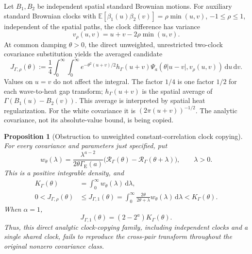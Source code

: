 \documentclass[12pt,oneside,openany]{book}
\makeatletter
\let\lean@pending\@empty
\newcommand{\LeanMarker}[1]{\gdef\lean@pending{#1}}
\numberwithin{equation}{section}
\newtheorem{proposition}[theorem]{Proposition}
\theoremstyle{nogostyle}
\theoremstyle{definition}
\newcommand{\E}{\mathbb{E}}
\newcommand{\ud}{\,\mathrm{d}}
\makeatother
\begin{document}
Let \(B_1,B_2\) be independent spatial standard Brownian motions. For auxiliary
standard Brownian clocks with \(\E[\beta_1(u)\beta_2(v)]=\rho\min(u,v)\),
\(-1\le\rho\le1\), independent of the spatial paths, the clock difference has
variance
\[
  v_\rho(u,v)=u+v-2\rho\min(u,v).
\]
At common damping \(\theta>0\), the direct unweighted, unrestricted two-clock
covariance substitution yields the averaged candidate
\begin{equation}\label{E:naive-clock-candidate}
  J_{\Gamma,\rho}(\theta)
  :=\frac14\int_0^\infty\int_0^\infty
  e^{-\theta^2(u+v)/2}h_\Gamma(u+v)
  \Psi_a(\theta|u-v|,v_\rho(u,v))\ud u\ud v .
\end{equation}
Values on \(u=v\) do not affect the integral. The factor \(1/4\) is one factor
\(1/2\) for each wave-to-heat gap transform; \(h_\Gamma(u+v)\) is the spatial
average of \(\Gamma(B_1(u)-B_2(v))\). This average is interpreted by spatial
heat regularization. For the white covariance it is \((2\pi(u+v))^{-1/2}\). The
analytic covariance, not its absolute-value bound, is being copied.

\LeanMarker{P:clock-copy-obstruction}
\begin{proposition}[Obstruction to unweighted constant-correlation clock copying]
  \label{P:clock-copy-obstruction}
  For every covariance and parameters just specified, put
  \begin{equation}\label{E:cross-clock-lambda-weight}
    w_\theta(\lambda)
    =\frac{\lambda^{a-2}}
    {2\theta\Gamma_{\mathrm{E}}(a)}
    \big(\mathcal{R}_\Gamma(\theta)
    -\mathcal{R}_\Gamma(\theta+\lambda)\big),\qquad\lambda>0.
  \end{equation}
  This is a positive integrable density, and
  \begin{equation}\label{E:clock-copy-obstruction}
    \begin{split}
      K_\Gamma(\theta)&=\int_0^\infty w_\theta(\lambda)\ud\lambda,\\
      0<J_{\Gamma,\rho}(\theta)
      &\le J_{\Gamma,1}(\theta)
      =\int_0^\infty
      \frac{2\theta}{2\theta+\lambda}w_\theta(\lambda)\ud\lambda
      <K_\Gamma(\theta).
    \end{split}
  \end{equation}
  When \(\alpha=1\),
  \begin{equation}\label{E:degree-one-clock-loss}
    J_{\Gamma,1}(\theta)=(2-2^a)K_\Gamma(\theta).
  \end{equation}
  Thus, this direct analytic clock-copying family, including independent clocks
  and a single shared clock, fails to reproduce the cross-pair transform
  throughout the original nonzero covariance class.
\end{proposition}
\end{document}

